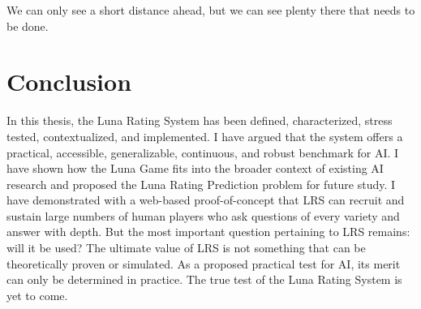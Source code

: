 \begin{savequote}[75mm]
We can only see a short distance ahead, but we can see plenty there that needs to be done.
\end{savequote}

\chapter{Conclusion}

In this thesis, the Luna Rating System has been defined, characterized, stress tested, contextualized, and implemented. I have argued that the system offers a practical, accessible, generalizable, continuous, and robust benchmark for AI. I have shown how the Luna Game fits into the broader context of existing AI research and proposed the Luna Rating Prediction problem for future study. I have demonstrated with a web-based proof-of-concept that LRS can recruit and sustain large numbers of human players who ask questions of every variety and answer with depth. But the most important question pertaining to LRS remains: will it be used? The ultimate value of LRS is not something that can be theoretically proven or simulated. As a proposed practical test for AI, its merit can only be determined in practice. The true test of the Luna Rating System is yet to come. 